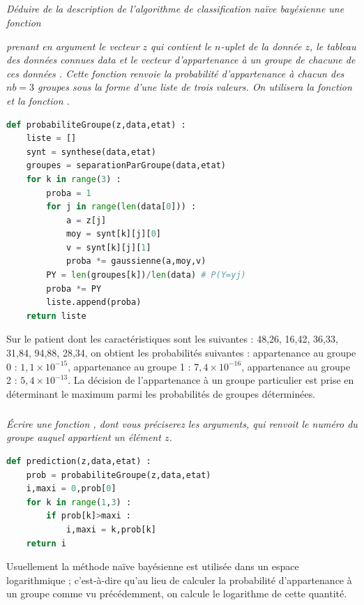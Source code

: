 \subparagraph{}\textit{Déduire de la description de l’algorithme de classification naïve bayésienne une fonction}

\textit{ prenant en argument le vecteur $z$ qui contient le
$n$-uplet de la donnée $z$, le tableau des données connues data et le vecteur d’appartenance à
un groupe de chacune de ces données . Cette fonction renvoie la probabilité d’appartenance
à chacun des $nb = 3$ groupes sous la forme d’une liste de trois valeurs. On utilisera la
fonction  et la fonction .}
\ifprof
\begin{corrige}
\begin{lstlisting}[language=Python]
def probabiliteGroupe(z,data,etat) :
    liste = []
    synt = synthese(data,etat)
    groupes = separationParGroupe(data,etat)
    for k in range(3) :
        proba = 1
        for j in range(len(data[0])) :
            a = z[j]
            moy = synt[k][j][0]
            v = synt[k][j][1]
            proba *= gaussienne(a,moy,v)
        PY = len(groupes[k])/len(data) # P(Y=yj)
        proba *= PY
        liste.append(proba)
    return liste
\end{lstlisting}
\end{corrige}
\else
\fi

\ifprof
\else
Sur le patient dont les caractéristiques sont les suivantes : 48,26, 16,42, 36,33, 31,84, 94,88, 28,34,
on obtient les probabilités suivantes : appartenance au groupe 0 : $1,1 \times 10^{-15}$, appartenance au groupe 1 : $7,4 \times 10^{-16}$, appartenance au groupe 2 : $5,4 \times 10^{-13}$.
La décision de l’appartenance à un groupe particulier est prise en déterminant le maximum parmi les
probabilités de groupes déterminées.
\fi

\subparagraph{}\textit{Écrire une fonction , dont vous préciserez les arguments, qui renvoit le numéro
du groupe auquel appartient un élément $z$.}
\ifprof
\begin{corrige}
\begin{lstlisting}[language=Python]
def prediction(z,data,etat) :
    prob = probabiliteGroupe(z,data,etat)
    i,maxi = 0,prob[0]
    for k in range(1,3) :
        if prob[k]>maxi :
            i,maxi = k,prob[k]
    return i
\end{lstlisting}
\end{corrige}
\else
\fi
\ifprof
\else
Usuellement la méthode naïve bayésienne est utilisée dans un espace logarithmique ; c’est-à-dire
qu’au lieu de calculer la probabilité d’appartenance à un groupe comme vu précédemment, on calcule
le logarithme de cette quantité.
\fi

